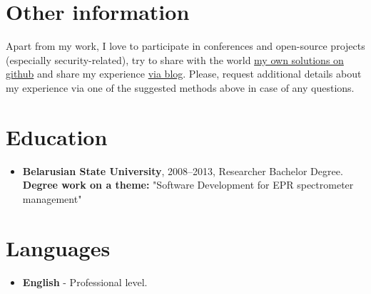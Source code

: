 \documentclass[a4paper, 12pt]{article}
\newcommand{\position}[1]{
    \textbf{#1}}
\begin{document}
\section*{Other information}  
Apart from my work, I love to participate in conferences and open-source projects (especially security-related), try to share with the world \href{https://github.com/EasyAppSecurity}{my own solutions on github} and share my experience \href{https://mikhailrusakovich.wordpress.com/}{via blog}. Please, request additional details about my experience via one of the suggested methods above in case of any questions.

\section*{Education}

    \begin{itemize}

        \item \position{Belarusian State University}, 2008--2013, Researcher Bachelor Degree.
            \newline\textbf{Degree work on a theme:} 
            \newline "Software Development for EPR spectrometer management"
    \end{itemize}
    
\section*{Languages}
 	\begin{itemize}
 		 \item \position{English} - Professional level.

 	\end{itemize}    
    
\end{document}
